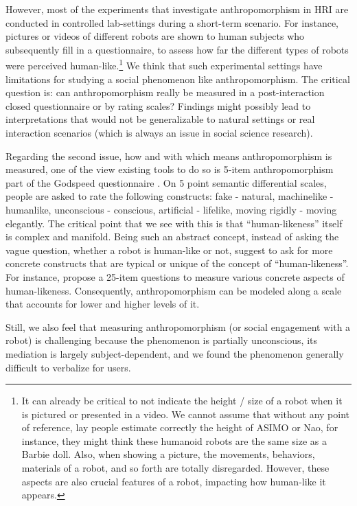 \documentclass{frontiersSCNS} %
\begin{document}
However, most of the experiments that investigate anthropomorphism in HRI are
conducted in controlled lab-settings during a short-term scenario. For instance,
pictures or videos of different robots are shown to human subjects who
subsequently fill in a questionnaire, to assess how far the different types of
robots were perceived human-like.\footnote{It can already be critical to not
indicate the height / size of a robot when it is pictured or presented in a
video. We cannot assume that without any point of reference, lay people estimate
correctly the height of ASIMO or Nao, for instance, they might think these
humanoid robots are the same size as a Barbie doll. Also, when showing a
picture, the movements, behaviors, materials of a robot, and so forth are
totally disregarded. However, these aspects are also crucial features of a
robot, impacting how human-like it appears.} We think that such experimental
settings have limitations for studying a social phenomenon like
anthropomorphism. The critical question is: can anthropomorphism really be
measured in a post-interaction closed questionnaire or by rating scales?
Findings might possibly lead to interpretations that would not be generalizable
to natural settings or real interaction scenarios (which is always an issue in
social science research).

Regarding the second issue, how and with which means anthropomorphism is
measured, one of the view existing tools to do so is 5-item anthropomorphism
part of the Godspeed questionnaire \citep{bartneck_measurement_2008}. On 5 point
semantic differential scales, people are asked to rate the following constructs:
fake - natural, machinelike - humanlike, unconscious - conscious, artificial -
lifelike, moving rigidly - moving elegantly. The critical point that we see with
this is that ``human-likeness'' itself is complex and manifold. Being such an
abstract concept, instead of asking the vague question, whether a robot is
human-like or not, \cite{kahn_jr._robotic_2006} suggest to ask for more concrete
constructs that are typical or unique of the concept of ``human-likeness''.  For
instance, \cite{ruijten_introducing_2014} propose a 25-item questions to measure
various concrete aspects of human-likeness. Consequently, anthropomorphism can
be modeled along a scale that accounts for lower and higher levels of it.

Still, we also feel that measuring anthropomorphism (or social engagement with a
robot) is challenging because the phenomenon is partially unconscious, its
mediation is largely subject-dependent, and we found the phenomenon generally
difficult to verbalize for users.
\end{document}
